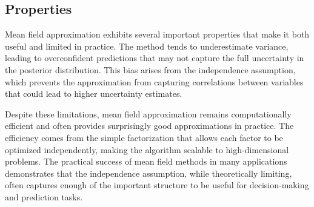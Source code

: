 \subsection{Properties}

Mean field approximation exhibits several important properties that make it both useful and limited in practice. The method tends to underestimate variance, leading to overconfident predictions that may not capture the full uncertainty in the posterior distribution. This bias arises from the independence assumption, which prevents the approximation from capturing correlations between variables that could lead to higher uncertainty estimates.

Despite these limitations, mean field approximation remains computationally efficient and often provides surprisingly good approximations in practice. The efficiency comes from the simple factorization that allows each factor to be optimized independently, making the algorithm scalable to high-dimensional problems. The practical success of mean field methods in many applications demonstrates that the independence assumption, while theoretically limiting, often captures enough of the important structure to be useful for decision-making and prediction tasks.





